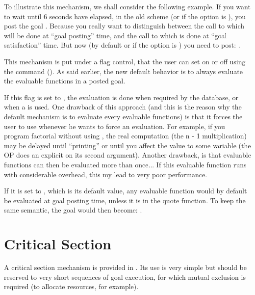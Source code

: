 To illustrate this mechanism, we shall consider the following example. If you
want to wait until 6 seconds have elapsed, in the old scheme (or if the
 option is ), you post the goal . Because you really want to distinguish
between the call to  which will be done at ``goal posting'' time,
and the call to  which is done at ``goal satisfaction'' time.  But
now (by default or if the  option is ) you need to
post: .

This mechanism is put under a flag control, that the user can set on or off
using the command  (). As said earlier, the new default behavior is to always
evaluate the evaluable functions in a posted goal.

If this flag is set to , the evaluation is done when required by the
database, or when a  is used. One drawback of this approach (and
this is the reason why the default mechanism is to evaluate every evaluable
functions) is that it forces the user to use  whenever he wants
to force an evaluation. For example, if you program factorial without using
, the real computation (the n - 1 multiplication) may be
delayed until ``printing'' or until you affect the value to some variable (the
\code{=} OP does an explicit  on its second argument). Another
drawback, is that evaluable functions can then be evaluated more than once...
If this evaluable function runs with considerable overhead, this my lead to very
poor performance.

If it is set to , which is its default value, any evaluable function
would by default be evaluated at goal posting time, unless it is in the quote
function. To keep the same semantic, the goal  would then become: .

\section{Critical Section}

A critical section mechanism is provided in \COPRS{}. Its use is very simple but
should be reserved to very short sequences of goal execution, for which mutual
exclusion is required (to allocate resources, for example).

